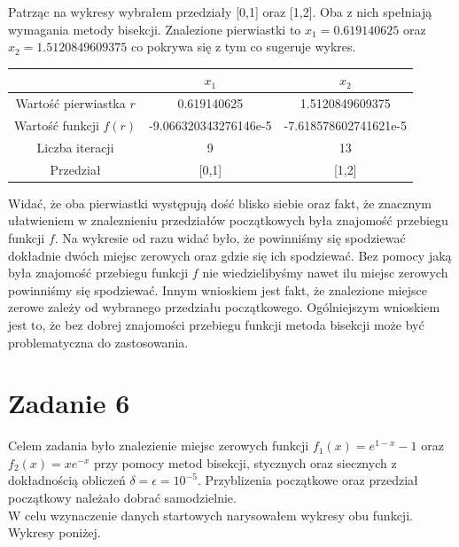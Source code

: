 \documentclass[]{article}
\begin{document}
	Patrząc na wykresy wybrałem przedziały [0,1] oraz [1,2]. Oba z nich spełniają wymagania metody bisekcji. Znalezione pierwiastki to $x_1=0.619140625$ oraz $x_2=1.5120849609375$ co pokrywa się z tym co sugeruje wykres.
	
	
	\begin{table}[!h]
		\centering
		\label{tab:table1}
		\begin{tabular}{c|c|c}
			
			 & $x_1$ & $x_2$ \\ \hline
			Wartość pierwiastka $r$ &  0.619140625 & 1.5120849609375 \\ 
			Wartość funkcji $f(r)$ & -9.066320343276146e-5 & -7.618578602741621e-5  \\ 
			Liczba iteracji & 9 & 13 \\
			Przedział & [0,1] & [1,2] \\
		\end{tabular}
	\end{table}

	Widać, że oba pierwiastki występują dość blisko siebie oraz fakt, że znacznym ułatwieniem w znaleznieniu przedziałów początkowych była znajomość przebiegu funkcji $f$. Na wykresie od razu widać było, że powinniśmy się spodziewać dokładnie dwóch miejsc zerowych oraz gdzie się ich spodziewać. Bez pomocy jaką była znajomość przebiegu funkcji $f$ nie wiedzielibyśmy nawet ilu miejsc zerowych powinniśmy się spodziewać. Innym wnioskiem jest fakt, że znalezione miejsce zerowe zależy od wybranego przedziału początkowego. Ogólniejszym wnioskiem jest to, że bez dobrej znajomości przebiegu funkcji metoda bisekcji może być problematyczna do zastosowania. 

	\clearpage
	
	\section*{Zadanie 6}
	
	Celem zadania było znalezienie miejsc zerowych funkcji $f_1(x)=e^{1-x}-1$ oraz $f_2(x)=xe^{-x}$ przy pomocy metod bisekcji, stycznych oraz siecznych z dokładnością obliczeń $\delta=\epsilon=10^{-5}$. Przyblizenia początkowe oraz przedział początkowy należało dobrać samodzielnie.\\
	W celu wzynaczenie danych startowych narysowałem wykresy obu funkcji. Wykresy poniżej.
\end{document}
